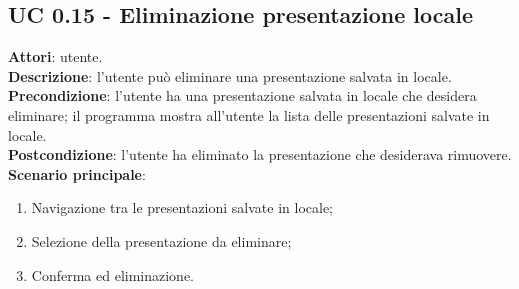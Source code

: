 \subsection{UC 0.15 - Eliminazione presentazione locale}{
	\label{uc0.15}
	\textbf{Attori}: utente.\\
	\textbf{Descrizione}: l'utente può eliminare una presentazione salvata in locale.\\
	\textbf{Precondizione}: l'utente ha una presentazione salvata in locale che desidera eliminare; il programma mostra all'utente la lista delle presentazioni salvate in locale.\\
	\textbf{Postcondizione}: l'utente ha eliminato la presentazione che desiderava rimuovere.\\
	\textbf{Scenario principale}:
	\begin{enumerate}
		\item Navigazione tra le presentazioni salvate in locale;
		\item Selezione della presentazione da eliminare;
		\item Conferma ed eliminazione.
	\end{enumerate}
}